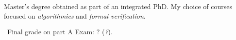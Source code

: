 Master's degree obtained as part of an integrated PhD. My choice of courses
focused on \emph{algorithmics} and \emph{formal verification}.

\medskip

\faFileO\ Final grade on part A Exam: $?$ (\emph{?}).
